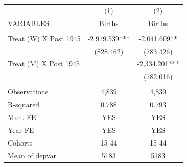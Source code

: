 \begin{tabular}{lcc} \hline
 & (1) & (2) \\
VARIABLES & Births & Births \\ \hline
 &  &  \\
Treat (W) X Post 1945 & -2,979.539*** & -2,041.609** \\
 & (828.462) & (783.426) \\
Treat (M) X Post 1945 &  & -2,334.201*** \\
 &  & (782.016) \\
 &  &  \\
Observations & 4,839 & 4,839 \\
R-squared & 0.788 & 0.793 \\
Mun. FE & YES & YES \\
Year FE & YES & YES \\
Cohorts & 15-44 & 15-44 \\
 Mean of depvar & 5183 & 5183 \\ \hline
\end{tabular}
